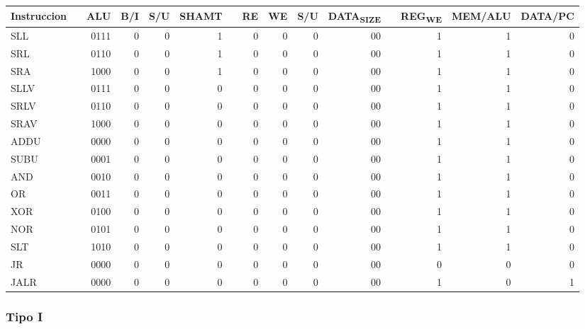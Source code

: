 \documentclass[11pt]{article}
\begin{document}
\begin{enumerate}
\begin{center}
\begin{tabular}{llrrrrlrrrrlrrr}
Instruccion &  & ALU & B/I & S/U & SHAMT &  & RE & WE & S/U & DATA\textsubscript{SIZE} &  & REG\textsubscript{WE} & MEM/ALU & DATA/PC\\
\hline
SLL &  & 0111 & 0 & 0 & 1 &  & 0 & 0 & 0 & 00 &  & 1 & 1 & 0\\
SRL &  & 0110 & 0 & 0 & 1 &  & 0 & 0 & 0 & 00 &  & 1 & 1 & 0\\
SRA &  & 1000 & 0 & 0 & 1 &  & 0 & 0 & 0 & 00 &  & 1 & 1 & 0\\
SLLV &  & 0111 & 0 & 0 & 0 &  & 0 & 0 & 0 & 00 &  & 1 & 1 & 0\\
SRLV &  & 0110 & 0 & 0 & 0 &  & 0 & 0 & 0 & 00 &  & 1 & 1 & 0\\
SRAV &  & 1000 & 0 & 0 & 0 &  & 0 & 0 & 0 & 00 &  & 1 & 1 & 0\\
ADDU &  & 0000 & 0 & 0 & 0 &  & 0 & 0 & 0 & 00 &  & 1 & 1 & 0\\
SUBU &  & 0001 & 0 & 0 & 0 &  & 0 & 0 & 0 & 00 &  & 1 & 1 & 0\\
AND &  & 0010 & 0 & 0 & 0 &  & 0 & 0 & 0 & 00 &  & 1 & 1 & 0\\
OR &  & 0011 & 0 & 0 & 0 &  & 0 & 0 & 0 & 00 &  & 1 & 1 & 0\\
XOR &  & 0100 & 0 & 0 & 0 &  & 0 & 0 & 0 & 00 &  & 1 & 1 & 0\\
NOR &  & 0101 & 0 & 0 & 0 &  & 0 & 0 & 0 & 00 &  & 1 & 1 & 0\\
SLT &  & 1010 & 0 & 0 & 0 &  & 0 & 0 & 0 & 00 &  & 1 & 1 & 0\\
JR &  & 0000 & 0 & 0 & 0 &  & 0 & 0 & 0 & 00 &  & 0 & 0 & 0\\
JALR &  & 0000 & 0 & 0 & 0 &  & 0 & 0 & 0 & 00 &  & 1 & 0 & 1\\
\end{tabular}
\end{center}
\end{enumerate}

\subsubsection{Tipo I}
\label{sec:orgfc33cee}
\end{document}

